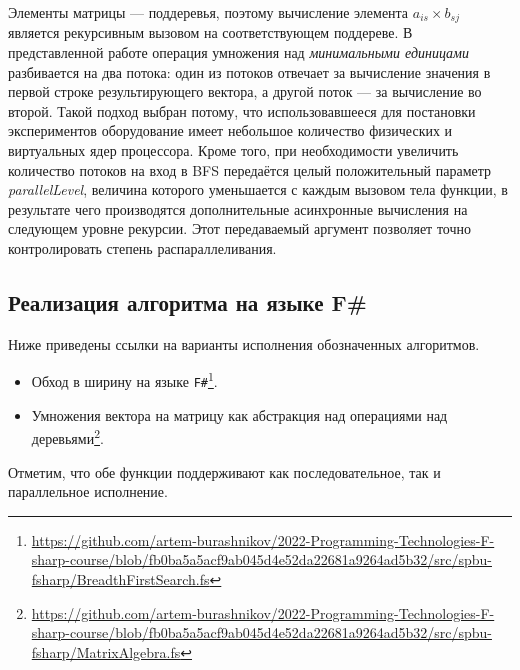 Элементы матрицы --- поддеревья, поэтому вычисление элемента $a_{is} \times b_{sj}$ является рекурсивным вызовом на соответствующем поддереве. В представленной работе операция умножения над \textit{минимальными единицами} разбивается на два потока: один из потоков отвечает за вычисление значения в первой строке результирующего вектора, а другой поток --- за вычисление во
второй. Такой подход выбран потому, что использовавшееся для постановки экспериментов оборудование имеет небольшое количество физических и виртуальных ядер процессора. Кроме того, при необходимости увеличить количество потоков на вход в BFS передаётся целый положительный параметр \textit{parallelLevel}, величина которого уменьшается с каждым вызовом тела функции, в результате чего производятся дополнительные асинхронные вычисления на следующем уровне рекурсии. Этот передаваемый аргумент позволяет точно контролировать степень распараллеливания.

\subsection{Реализация алгоритма на языке F\#}
Ниже приведены ссылки на варианты исполнения обозначенных алгоритмов.
\begin{itemize}
	\item Обход в ширину на языке \texttt{F\#}\footnote{\url{https://github.com/artem-burashnikov/2022-Programming-Technologies-F-sharp-course/blob/fb0ba5a5acf9ab045d4e52da22681a9264ad5b32/src/spbu-fsharp/BreadthFirstSearch.fs}}.
	\item Умножения вектора на матрицу как абстракция над операциями над деревьями\footnote{\url{https://github.com/artem-burashnikov/2022-Programming-Technologies-F-sharp-course/blob/fb0ba5a5acf9ab045d4e52da22681a9264ad5b32/src/spbu-fsharp/MatrixAlgebra.fs}}.
\end{itemize}

Отметим, что обе функции поддерживают как последовательное, так и параллельное исполнение.
